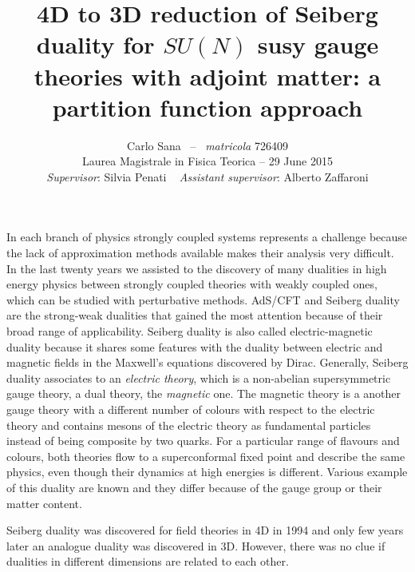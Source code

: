\documentclass[a4paper,12pt]{article}
\author{
 Carlo Sana  ~--~ \emph{matricola} 726409 \\
 Laurea Magistrale in Fisica Teorica -- 29 June 2015\\
\emph{Supervisor}: Silvia Penati 
~
\emph{Assistant supervisor}: Alberto Zaffaroni\\
}
\date{}
\title{ \textbf{4D to 3D reduction of Seiberg duality for $SU(N)$ susy gauge theories with adjoint matter: a partition function approach }}
\begin{document}
\maketitle
In each branch of physics strongly coupled systems represents a challenge because the lack of approximation methods available makes their analysis very difficult.\\
In the last twenty years we assisted to the discovery of many dualities in high energy physics between strongly coupled theories with weakly coupled ones, which can be studied with perturbative methods.
AdS/CFT  and Seiberg duality are the strong-weak dualities that gained the most attention because of their broad range of applicability.
Seiberg duality is also called electric-magnetic duality because it shares some features with the duality between electric and magnetic fields in the Maxwell's equations discovered by Dirac.
Generally, Seiberg duality associates to an \emph{electric theory}, which is a non-abelian supersymmetric gauge theory, a dual theory, the \emph{magnetic} one. 
The magnetic theory is a another gauge theory with a different number of colours with respect to the electric theory and contains mesons of the electric theory as fundamental particles instead of being composite by two quarks.
For a particular range of flavours and colours, both theories flow to a superconformal fixed point and describe the same physics, even though their dynamics at high energies is different.
Various example of this duality are known and they differ because of the gauge group or their matter content.

Seiberg duality was discovered for field theories in 4D in 1994 and only few years later an analogue duality was discovered in 3D.
However, there was no clue if dualities in different dimensions are related to each other.
\end{document}
